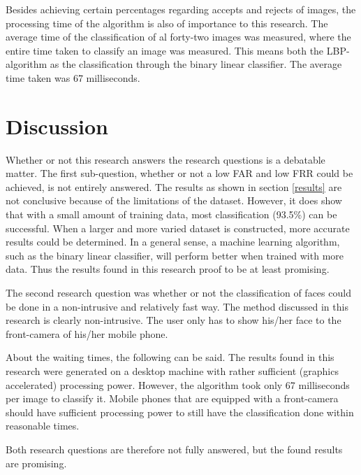 \documentclass{sig-alternate-br}
\begin{document}
Besides achieving certain percentages regarding accepts and rejects of images, the processing time of the algorithm is also of importance to this research. The average time of the classification of al forty-two images was measured, where the entire time taken to classify an image was measured. This means both the LBP-algorithm as the classification through the binary linear classifier. The average time taken was 67 milliseconds.

\section{Discussion} \label{discussion}
Whether or not this research answers the research questions is a debatable matter. The first sub-question, whether or not a low FAR and low FRR could be achieved, is not entirely answered. The results as shown in section \ref{results} are not conclusive because of the limitations of the dataset. However, it does show that with a small amount of training data, most classification (93.5\%) can be successful. When a larger and more varied dataset is constructed, more accurate results could be determined. In a general sense, a machine learning algorithm, such as the binary linear classifier, will perform better when trained with more data. Thus the results found in this research proof to be at least promising.

The second research question was whether or not the classification of faces could be done in a non-intrusive and relatively fast way. The method discussed in this research is clearly non-intrusive. The user only has to show his/her face to the front-camera of his/her mobile phone.

About the waiting times, the following can be said. The results found in this research were generated on a desktop machine with rather sufficient (graphics accelerated) processing power. However, the algorithm took only 67 milliseconds per image to classify it. Mobile phones that are equipped with a front-camera should have sufficient processing power to still have the classification done within reasonable times.

Both research questions are therefore not fully answered, but the found results are promising.




\balancecolumns
\end{document}
